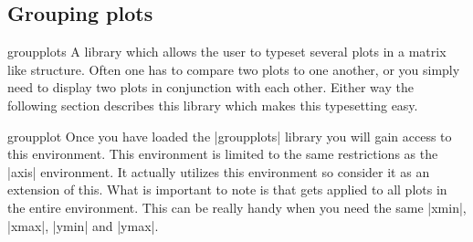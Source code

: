 \subsection{Grouping plots}
\label{sec:group:plot}

{}

%


\begin{pgfplotslibrary}{groupplots}
  A library which allows the user to typeset several plots in a matrix like structure.
  Often one has to compare two plots to one another, or you simply need to display two plots in conjunction with each other. Either way the following
  section describes this library which makes this typesetting easy.
\end{pgfplotslibrary}

\begin{environment}{{groupplot}}
  Once you have loaded the |groupplots| library you will gain access to this environment. This environment is limited to the same restrictions as the
  |axis| environment. It actually utilizes this environment so consider it as an extension of this. What is important to note is that  gets
  applied to all plots in the entire environment. This can be really handy when you need the same |xmin|, |xmax|, |ymin| and |ymax|.
\end{environment}

